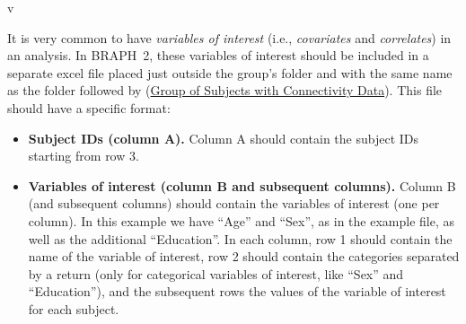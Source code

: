 v\documentclass[justified]{tufte-handout}
\begin{document}
It is very common to have \emph{variables of interest} (i.e., \emph{covariates} and \emph{correlates}) in an analysis. In BRAPH~2, these variables of interest should be included in a separate excel file placed just outside the group's folder and with the same name as the folder followed by  (\href{https://github.com/braph-software/BRAPH-2/tree/develop/tutorials/general/tut_gr_con}{Group of Subjects with Connectivity Data}).
This file should have a specific format:
\begin{itemize}

\item {\bf Subject IDs (column A).}
Column A should contain the subject IDs starting from row 3.

\item {\bf Variables of interest (column B and subsequent columns).}
Column B (and subsequent columns) should contain the variables of interest (one per column). 
In this example we have ``Age'' and ``Sex'', as in the example file, as well as the additional ``Education''.
In each column, row 1 should contain the name of the variable of interest, row 2 should contain the categories separated by a return (only for categorical variables of interest, like ``Sex'' and ``Education''), and the subsequent rows the values of the variable of interest for each subject.

\end{itemize}	
\end{document}

